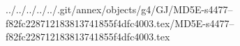 ../../../../../.git/annex/objects/g4/GJ/MD5E-s4477--f82fc228712183813741855f4dfc4003.tex/MD5E-s4477--f82fc228712183813741855f4dfc4003.tex
